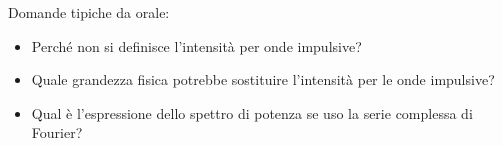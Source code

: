 \begin{note}
	Domande tipiche da orale:
	\begin{itemize}
		
		\item Perché non si definisce l'intensità per onde impulsive?
		\item Quale grandezza fisica potrebbe sostituire l'intensità per le onde impulsive?
		\item Qual è l'espressione dello spettro di potenza se uso la serie complessa di Fourier?
	\end{itemize}
\end{note}